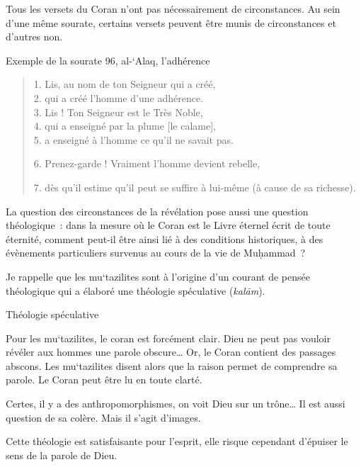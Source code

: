 Tous les versets du Coran n'ont pas nécessairement de circonstances. Au
sein d'une même sourate, certains versets peuvent être munis de
circonstances et d'autres non.

Exemple de la sourate 96, al-`Alaq, l'adhérence
\begin{quote}
   1. Lis, au nom de ton Seigneur qui a créé,\\
2. qui a créé l'homme d'une adhérence.\\
3. Lis ! Ton Seigneur est le Très Noble,\\
4. qui a enseigné par la plume {[}le calame{]},\\
5. a enseigné à l'homme ce qu'il ne savait pas.

6. Prenez-garde ! Vraiment l'homme devient rebelle,

7. dès qu'il estime qu'il peut se suffire à lui-même (à cause de sa
richesse). 
\end{quote}


La question des circonstances de la révélation pose aussi une question
théologique~: dans la mesure où le Coran est le Livre éternel écrit de
toute éternité, comment peut-il être ainsi lié à des conditions
historiques, à des évènements particuliers survenus au cours de la vie
de Muḥammad~?


Je rappelle que les mu`tazilites sont à l'origine d'un courant de pensée
théologique qui a élaboré une théologie spéculative (\emph{kalām}).

\begin{Def}[kalām]
Théologie spéculative
\end{Def}
Pour les mu`tazilites, le coran est forcément clair. Dieu ne peut pas
vouloir révéler aux hommes une parole obscure\ldots{} Or, le Coran
contient des passages abscons. Les mu`tazilites disent alors que la
raison permet de comprendre sa parole. Le Coran peut être lu en toute
clarté.

Certes, il y a des anthropomorphismes, on voit Dieu sur un trône\ldots{}
Il est aussi question de sa colère. Mais il s'agit d'images.

Cette théologie est satisfaisante pour l'esprit, elle risque cependant
d'épuiser le sens de la parole de Dieu.

